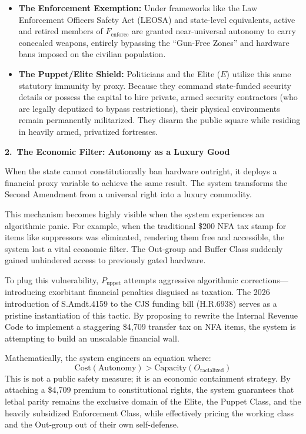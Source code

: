 \documentclass[12pt,openany]{book}
\begin{document}
\begin{itemize}
    \item \textbf{The Enforcement Exemption:} Under frameworks like the Law Enforcement Officers Safety Act (LEOSA) and state-level equivalents, active and retired members of $F_{\text{enforce}}$ are granted near-universal autonomy to carry concealed weapons, entirely bypassing the ``Gun-Free Zones'' and hardware bans imposed on the civilian population.

    \item \textbf{The Puppet/Elite Shield:} Politicians and the Elite ($E$) utilize this same statutory immunity by proxy. Because they command state-funded security details or possess the capital to hire private, armed security contractors (who are legally deputized to bypass restrictions), their physical environments remain permanently militarized. They disarm the public square while residing in heavily armed, privatized fortresses.
\end{itemize}

\medskip
\noindent\textbf{2.\ The Economic Filter: Autonomy as a Luxury Good}

\noindent When the state cannot constitutionally ban hardware outright, it deploys a financial proxy variable to achieve the same result. The system transforms the Second Amendment from a universal right into a luxury commodity.

This mechanism becomes highly visible when the system experiences an algorithmic panic. For example, when the traditional \$200 NFA tax stamp for items like suppressors was eliminated, rendering them free and accessible, the system lost a vital economic filter. The Out-group and Buffer Class suddenly gained unhindered access to previously gated hardware.

To plug this vulnerability, $P_{\text{uppet}}$ attempts aggressive algorithmic corrections---introducing exorbitant financial penalties disguised as taxation. The 2026 introduction of S.Amdt.4159 to the CJS funding bill (H.R.6938) serves as a pristine instantiation of this tactic. By proposing to rewrite the Internal Revenue Code to implement a staggering \$4,709 transfer tax on NFA items, the system is attempting to build an unscalable financial wall.

Mathematically, the system engineers an equation where:
\[
\text{Cost}(\text{Autonomy}) > \text{Capacity}(O_{\text{racialized}})
\]
This is not a public safety measure; it is an economic containment strategy. By attaching a \$4,709 premium to constitutional rights, the system guarantees that lethal parity remains the exclusive domain of the Elite, the Puppet Class, and the heavily subsidized Enforcement Class, while effectively pricing the working class and the Out-group out of their own self-defense.
\end{document}
